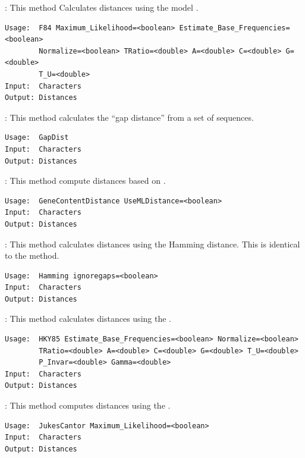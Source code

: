\documentclass[11pt]{article}
\begin{document}
{}:
This method Calculates distances using the  model \cite{SOWH1996}.
\begin{verbatim}
Usage:  F84 Maximum_Likelihood=<boolean> Estimate_Base_Frequencies=<boolean>
        Normalize=<boolean> TRatio=<double> A=<double> C=<double> G=<double>
        T_U=<double>
Input:  Characters
Output: Distances
\end{verbatim}

{}:
This method calculates the ``gap distance'' from a set of sequences.
\begin{verbatim}
Usage:  GapDist
Input:  Characters
Output: Distances
\end{verbatim}

{}:
This method compute distances based on  \cite{HusonSteel2003b}.
\begin{verbatim}
Usage:  GeneContentDistance UseMLDistance=<boolean>
Input:  Characters
Output: Distances
\end{verbatim}

{}:
This method calculates distances using the Hamming distance.
This is identical to the  method.
\begin{verbatim}
Usage:  Hamming ignoregaps=<boolean>
Input:  Characters
Output: Distances
\end{verbatim}

{}:
This method calculates distances using the
.
\begin{verbatim}
Usage:  HKY85 Estimate_Base_Frequencies=<boolean> Normalize=<boolean>
        TRatio=<double> A=<double> C=<double> G=<double> T_U=<double>
        P_Invar=<double> Gamma=<double>
Input:  Characters
Output: Distances
\end{verbatim}


{}:
This method computes distances using the 
\cite{SOWH1996}.
\begin{verbatim}
Usage:  JukesCantor Maximum_Likelihood=<boolean>
Input:  Characters
Output: Distances
\end{verbatim}
\end{document}
